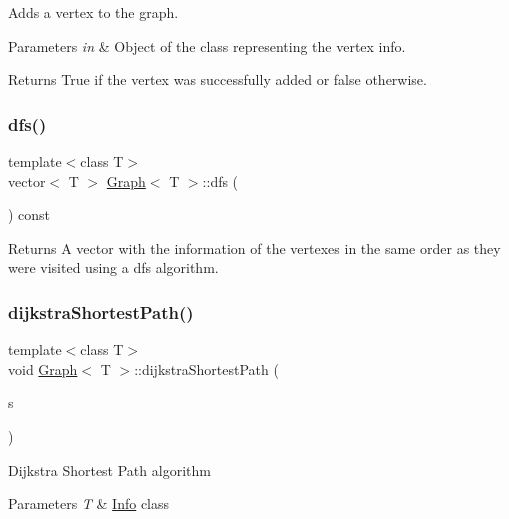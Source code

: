 Adds a vertex to the graph. 
\begin{DoxyParams}{Parameters}
{\em in} & Object of the class representing the vertex info.\\
\hline
\end{DoxyParams}
\begin{DoxyReturn}{Returns}
True if the vertex was successfully added or false otherwise. 
\end{DoxyReturn}
\mbox{\label{class_graph_a911798b1a89f8c4ae90ba3eee849cff8}} 
\subsubsection{\texorpdfstring{dfs()}{dfs()}}
{\footnotesize\ttfamily template$<$class T$>$ \\
vector$<$ T $>$ \hyperlink{class_graph}{Graph}$<$ T $>$\+::dfs (\begin{DoxyParamCaption}{ }\end{DoxyParamCaption}) const}

\begin{DoxyReturn}{Returns}
A vector with the information of the vertexes in the same order as they were visited using a dfs algorithm. 
\end{DoxyReturn}
\mbox{\label{class_graph_a445a38cf4045797198eae2b818b602de}} 
\subsubsection{\texorpdfstring{dijkstra\+Shortest\+Path()}{dijkstraShortestPath()}}
{\footnotesize\ttfamily template$<$class T$>$ \\
void \hyperlink{class_graph}{Graph}$<$ T $>$\+::dijkstra\+Shortest\+Path (\begin{DoxyParamCaption}\item[{const T \&}]{s }\end{DoxyParamCaption})}

Dijkstra Shortest Path algorithm 
\begin{DoxyParams}{Parameters}
{\em T} & \hyperlink{class_info}{Info} class \\
\hline
\end{DoxyParams}
\mbox{\label{class_graph_a7e137f1ef838395ac1044a944fa54448}} 
